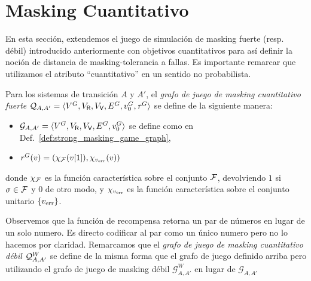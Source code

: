 \section{Masking Cuantitativo} \label{sec:QuantMask_mask}
En esta sección, extendemos el juego de simulación de masking fuerte (resp. débil) introducido anteriormente con objetivos cuantitativos para así definir la noción de distancia de masking-tolerancia a fallas.
Es importante remarcar que utilizamos el atributo  ``cuantitativo'' en un sentido no probabilista.
\begin{definition}  
  Para los sistemas de transición $A$ y $A'$, el \emph{grafo de juego de masking cuantitativo fuerte} 
  $\QMStrGame = \langle V^G, V_\Refuter, V_\Verifier, E^G,  \InitVertex^G,  \reward^G \rangle$ se define de la siguiente manera:
 
\begin{itemize}
\item
  $\mathcal{G}_{A, A'}=\langle V^G, V_\Refuter, V_\Verifier, E^G, \InitVertex^G \rangle$ se define como en Def.~\ref{def:strong_masking_game_graph},
\item
  $ \reward^G(v) = (\chi_{\Faults}(\pr{1}{v}), \chi_{\ErrorSt}(v))$

\end{itemize}
%
donde $\chi_{\Faults}$ es la función característica sobre el conjunto $\Faults$, devolviendo $1$ si $\sigma \in \Faults$ y $0$ de otro modo, y $\chi_{\ErrorSt}$ es la función característica sobre el conjunto unitario $\{\ErrorSt\}$.
\end{definition}
Observemos que la función de recompensa retorna un par de números en lugar de un solo numero. Es directo codificar al par como un único numero pero no lo hacemos por claridad. Remarcamos que el
\emph{grafo de juego de masking cuantitativo débil} $\QMWeakGame$
se define de la misma forma que el grafo de juego definido arriba pero utilizando el grafo de juego de masking débil $\mathcal{G}^W_{A, A'}$ en lugar de 
$\mathcal{G}_{A, A'}$


